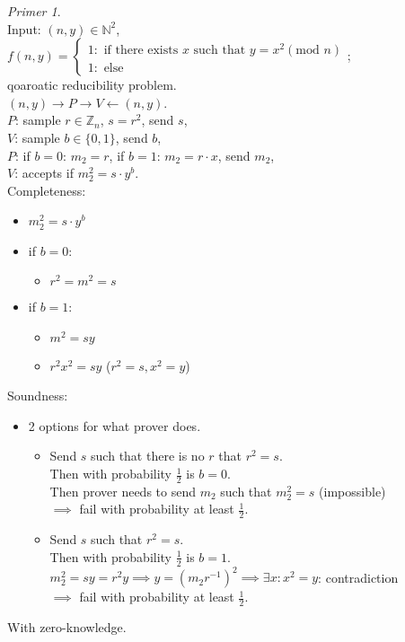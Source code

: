 \documentclass[a4paper, 12pt]{book}
\theoremstyle{definition}
\theoremstyle{remark}
\newtheorem*{ex}{Primer}
\newcommand{\N}{\mathbb{N}}
\newcommand{\Z}{\mathbb{Z}}
\begin{document}
\begin{ex} \text{} \\
  Input: $(n, y) \in \N^2$, \\
  $f(n, y) = \begin{cases}
    1: \text{ if there exists $x$ such that } y = x^2 (\text{mod } n) \\
    1: \text{ else}
  \end{cases}$; \\
  qoaroatic reducibility problem. \\
  $(n, y) \to P \to V \leftarrow (n, y)$. \\
  $P$: sample $r \in \Z_n$, $s = r^2$, send $s$, \\
  $V$: sample $b \in \{0, 1\}$, send $b$, \\
  $P$: if $b = 0$: $m_2 = r$, if $b = 1$: $m_2 = r \cdot x$, send $m_2$, \\
  $V$: accepts if $m_2^2 = s \cdot y^b$. \\
  Completeness:
  \begin{itemize}[label={}]
    \item $m_2^2 = s \cdot y^b$
    \item if $b = 0:$
    \begin{itemize}[label={}]
      \item $r^2 = m^2 = s$ \checkmark
    \end{itemize}
    \item if $b = 1:$
    \begin{itemize}[label={}]
      \item $m^2 = s y$ 
      \item $r^2 x^2 = s y$ \checkmark ($r^2 = s, x^2 = y$)
    \end{itemize}
  \end{itemize}
  Soundness:
  \begin{itemize}
    \item 2 options for what prover does.
    \begin{itemize}
      \item Send $s$ such that there is no $r$ that $r^2 = s$. \\
        Then with probability $\frac{1}{2}$ is $b = 0$. \\
        Then prover needs to send $m_2$ such that $m_2^2 = s$ (impossible) \\
        $\implies$ fail with probability at least $\frac{1}{2}$.
      \item Send $s$ such that $r^2 = s$. \\
        Then with probability $\frac{1}{2}$ is $b = 1$. \\
        $m_2^2 = s y = r^2 y \implies y = (m_2 r^{-1})^2 \implies \exists x: x^2 = y$: contradiction \\
        $\implies$ fail with probability at least $\frac{1}{2}$.
    \end{itemize}
  \end{itemize}
  With zero-knowledge.
\end{ex}
\end{document}
